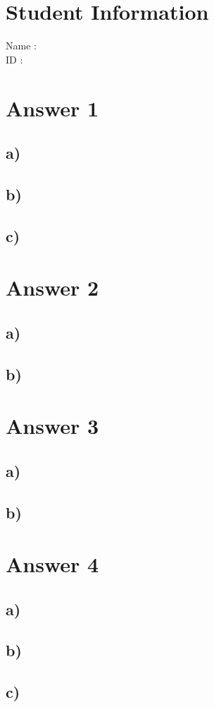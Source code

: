 \documentclass[12pt]{article}
\begin{document}
\section*{Student Information}

Name : \\

ID : \\


\section*{Answer 1}
\subsection*{a)} 

\subsection*{b)} 

\subsection*{c)} 


\section*{Answer 2}
\subsection*{a)} 

\subsection*{b)} 


\section*{Answer 3}
\subsection*{a)} 

\subsection*{b)} 


\section*{Answer 4}
\subsection*{a)} 

\subsection*{b)} 

\subsection*{c)} 
\end{document}
